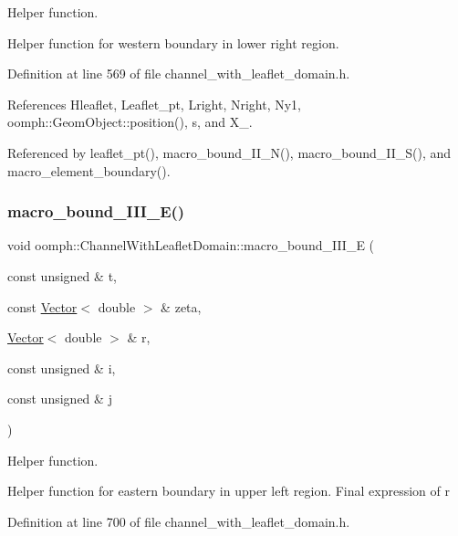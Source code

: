 Helper function. 

Helper function for western boundary in lower right region. 

Definition at line 569 of file channel\+\_\+with\+\_\+leaflet\+\_\+domain.\+h.



References Hleaflet, Leaflet\+\_\+pt, Lright, Nright, Ny1, oomph\+::\+Geom\+Object\+::position(), s, and X\+\_.



Referenced by leaflet\+\_\+pt(), macro\+\_\+bound\+\_\+\+I\+I\+\_\+\+N(), macro\+\_\+bound\+\_\+\+I\+I\+\_\+\+S(), and macro\+\_\+element\+\_\+boundary().

\mbox{\label{classoomph_1_1ChannelWithLeafletDomain_af17451c66c723d841aa6f16505c51be3}} 
\subsubsection{\texorpdfstring{macro\+\_\+bound\+\_\+\+I\+I\+I\+\_\+\+E()}{macro\_bound\_III\_E()}}
{\footnotesize\ttfamily void oomph\+::\+Channel\+With\+Leaflet\+Domain\+::macro\+\_\+bound\+\_\+\+I\+I\+I\+\_\+E (\begin{DoxyParamCaption}\item[{const unsigned \&}]{t,  }\item[{const \hyperlink{classoomph_1_1Vector}{Vector}$<$ double $>$ \&}]{zeta,  }\item[{\hyperlink{classoomph_1_1Vector}{Vector}$<$ double $>$ \&}]{r,  }\item[{const unsigned \&}]{i,  }\item[{const unsigned \&}]{j }\end{DoxyParamCaption})\hspace{0.3cm}{\ttfamily [protected]}}



Helper function. 

Helper function for eastern boundary in upper left region. Final expression of r 

Definition at line 700 of file channel\+\_\+with\+\_\+leaflet\+\_\+domain.\+h.



